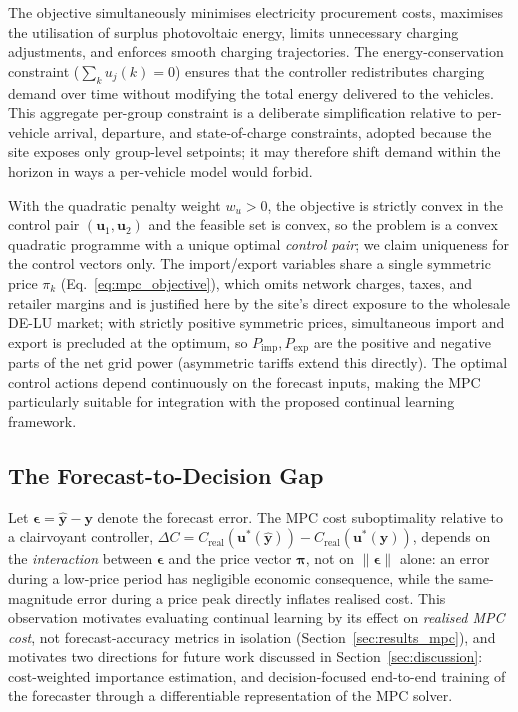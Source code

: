 \documentclass[journal]{IEEEtran}
\begin{document}
The objective simultaneously minimises electricity procurement costs,
maximises the utilisation of surplus photovoltaic energy, limits
unnecessary charging adjustments, and enforces smooth charging
trajectories. The energy-conservation constraint
($\sum_k u_j(k)=0$) ensures that the controller redistributes charging
demand over time without modifying the total energy delivered to the
vehicles. This aggregate per-group constraint is a deliberate
simplification relative to per-vehicle arrival, departure, and
state-of-charge constraints, adopted because the site exposes only
group-level setpoints; it may therefore shift demand within the horizon
in ways a per-vehicle model would forbid.

With the quadratic penalty weight $w_u>0$, the objective is strictly
convex in the control pair $(\mathbf{u}_1,\mathbf{u}_2)$ and the feasible
set is convex, so the problem is a convex quadratic programme with a
unique optimal \emph{control pair}; we claim uniqueness for the control
vectors only. The import/export variables share a single symmetric price
$\pi_k$ (Eq.~\eqref{eq:mpc_objective}), which omits network charges,
taxes, and retailer margins and is justified here by the site's direct
exposure to the wholesale DE-LU market; with strictly positive symmetric
prices, simultaneous import and export is precluded at the optimum, so
$P_{\mathrm{imp}},P_{\mathrm{exp}}$ are the positive and negative parts of
the net grid power (asymmetric tariffs extend this directly). The optimal
control actions depend continuously on the forecast inputs, making the
MPC particularly suitable for integration with the proposed continual
learning framework.

\subsection{The Forecast-to-Decision Gap}
\label{sec:forecast_decision_gap}

Let $\boldsymbol{\epsilon}=\hat{\mathbf{y}}-\mathbf{y}$ denote the
forecast error. The MPC cost suboptimality relative to a clairvoyant
controller, $\Delta C = C_{\mathrm{real}}(\mathbf{u}^*(\hat{\mathbf{y}}))
- C_{\mathrm{real}}(\mathbf{u}^*(\mathbf{y}))$, depends on the
\emph{interaction} between $\boldsymbol{\epsilon}$ and the price vector
$\boldsymbol{\pi}$, not on $\|\boldsymbol{\epsilon}\|$ alone: an error
during a low-price period has negligible economic consequence, while
the same-magnitude error during a price peak directly inflates realised
cost. This observation motivates evaluating continual learning by its
effect on \emph{realised MPC cost}, not forecast-accuracy metrics in
isolation (Section~\ref{sec:results_mpc}), and motivates two directions
for future work discussed in Section~\ref{sec:discussion}: cost-weighted
importance estimation, and decision-focused end-to-end training of the
forecaster through a differentiable representation of the MPC solver.
\end{document}

